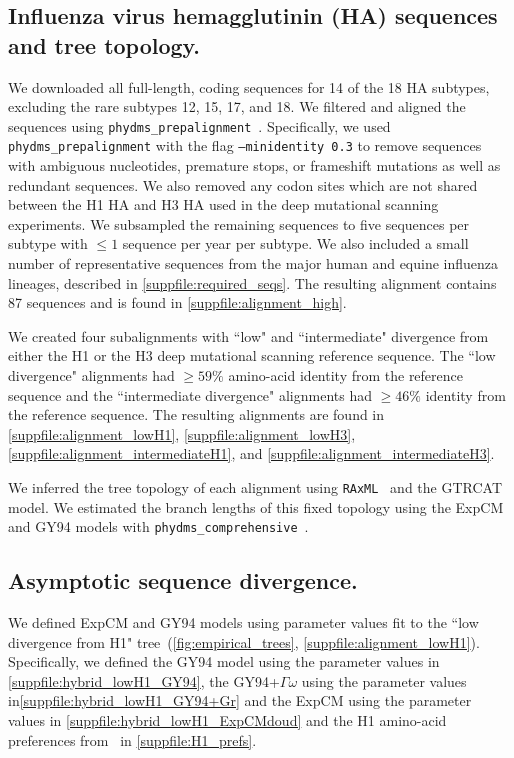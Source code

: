 \documentclass[11pt]{article}
\begin{document}
\subsection*{Influenza virus hemagglutinin (HA) sequences and tree topology.}

We downloaded all full-length, coding sequences for 14 of the 18 HA subtypes, excluding the rare subtypes 12, 15, 17, and 18. 
We filtered and aligned the sequences using \texttt{phydms\_prepalignment}~\citep{hilton2017phydms}. 
Specifically, we used \texttt{phydms\_prepalignment} with the flag \texttt{--minidentity 0.3} to remove sequences with ambiguous nucleotides, premature stops, or frameshift mutations as well as redundant sequences.  
We also removed any codon sites which are not shared between the H1 HA and H3 HA used in the deep mutational scanning experiments. 
We subsampled the remaining sequences to five sequences per subtype with $\le 1$ sequence per year per subtype. 
We also included a small number of representative sequences from the major human and equine influenza lineages, described in \ref{suppfile:required_seqs}. 
The resulting alignment contains 87 sequences and is found in \ref{suppfile:alignment_high}. 

We created four subalignments with ``low" and ``intermediate" divergence from either the H1 or the H3 deep mutational scanning reference sequence. 
The ``low divergence" alignments had   $\ge 59\%$ amino-acid identity from the reference sequence and the ``intermediate divergence" alignments had $\ge 46\%$ identity from the reference sequence.
The resulting alignments are found in \ref{suppfile:alignment_lowH1}, \ref{suppfile:alignment_lowH3}, \ref{suppfile:alignment_intermediateH1}, and \ref{suppfile:alignment_intermediateH3}.  

We inferred the tree topology of each alignment using \texttt{RAxML}~\citep{stamatakis2006raxml} and the GTRCAT model. 
We estimated the branch lengths of this fixed topology using the ExpCM and GY94 models with \texttt{phydms\_comprehensive}~\citep{hilton2017phydms}. 

\subsection*{Asymptotic sequence divergence.}

We defined ExpCM and GY94 models using parameter values fit to the ``low divergence from H1" tree~(\ref{fig:empirical_trees}, \ref{suppfile:alignment_lowH1}). 
Specifically, we defined the GY94 model using the parameter values in \ref{suppfile:hybrid_lowH1_GY94}, the GY94+$\Gamma\omega$ using the parameter values in\ref{suppfile:hybrid_lowH1_GY94+Gr} and the ExpCM using the parameter values in \ref{suppfile:hybrid_lowH1_ExpCMdoud} and the H1 amino-acid preferences from~\citet{doud2016accurate} in \ref{suppfile:H1_prefs}. 
\end{document}
